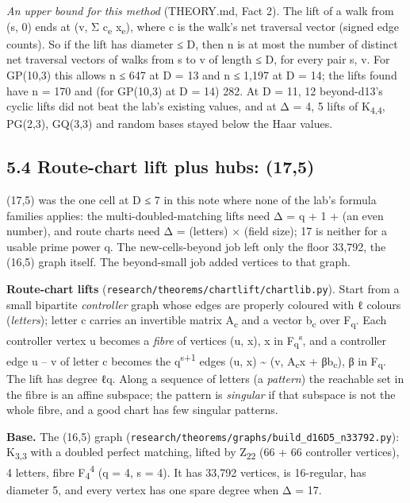 \documentclass[
  10pt,
]{article}
\begin{document}
\emph{An upper bound for this method} (THEORY.md, Fact 2). The lift of a walk from (s, 0) ends at (v, Σ
c\textsubscript{e} x\textsubscript{e}), where c is the walk's net traversal vector (signed edge counts). So if the
lift has diameter ≤ D, then n is at most the number of distinct net traversal vectors of walks from s to v of length ≤
D, for every pair s, v. For GP(10,3) this allows n ≤ 647 at D = 13 and n ≤ 1,197 at D = 14; the lifts found have n =
170 and (for GP(10,3) at D = 14) 282. At D = 11, 12 beyond-d13's cyclic lifts did not beat the lab's existing values,
and at Δ = 4, 5 lifts of K\textsubscript{4,4}, PG(2,3), GQ(3,3) and random bases stayed below the Haar values.

\hypertarget{route-chart-lift-plus-hubs-175}{%
\subsection{5.4 Route-chart lift plus hubs: (17,5)}\label{route-chart-lift-plus-hubs-175}}

(17,5) was the one cell at D ≤ 7 in this note where none of the lab's formula families applies: the
multi-doubled-matching lifts need Δ = q + 1 + (an even number), and route charts need Δ = (letters) × (field size); 17
is neither for a usable prime power q. The new-cells-beyond job left only the floor 33,792, the (16,5) graph itself.
The beyond-small job added vertices to that graph.

\textbf{Route-chart lifts} (\texttt{research/\allowbreak{}theorems/\allowbreak{}chartlift/\allowbreak{}chartlib.py}). Start from a small bipartite
\emph{controller} graph whose edges are properly coloured with ℓ colours (\emph{letters}); letter c carries an
invertible matrix A\textsubscript{c} and a vector b\textsubscript{c} over F\textsubscript{q}. Each controller vertex u
becomes a \emph{fibre} of vertices (u, x), x in F\textsubscript{q}\textsuperscript{s}, and a controller edge u -- v of
letter c becomes the q\textsuperscript{s+1} edges (u, x) \textasciitilde{} (v, A\textsubscript{c}x +
βb\textsubscript{c}), β in F\textsubscript{q}. The lift has degree ℓq. Along a sequence of letters (a \emph{pattern})
the reachable set in the fibre is an affine subspace; the pattern is \emph{singular} if that subspace is not the whole
fibre, and a good chart has few singular patterns.

\textbf{Base.} The (16,5) graph (\texttt{research/\allowbreak{}theorems/\allowbreak{}graphs/\allowbreak{}build\_\allowbreak{}d16D5\_\allowbreak{}n33792.py}): K\textsubscript{3,3} with
a doubled perfect matching, lifted by Z\textsubscript{22} (66 + 66 controller vertices), 4 letters, fibre
F\textsubscript{4}\textsuperscript{4} (q = 4, s = 4). It has 33,792 vertices, is 16-regular, has diameter 5, and every
vertex has one spare degree when Δ = 17.
\end{document}
